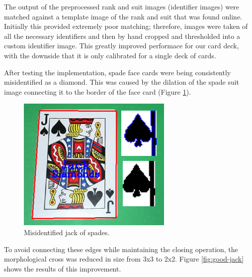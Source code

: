\documentclass[conference]{IEEEtran}
\begin{document}

The output of the preprocessed rank and suit images (identifier images) were matched against a
template image of the rank and suit that was found online. Initially this provided extremely poor
matching; therefore, images were taken of all the necessary identifiers and then by hand cropped and
thresholded into a custom identifier image. This greatly improved performace for our card deck, with
the downside that it is only calibrated for a single deck of cards.

After testing the implementation, spade face cards were being consistently misidentified as a
diamond. This was caused by the dilation of the spade suit image connecting it to the border of the
face card (Figure \ref{fig:bad-jack}).

\begin{figure}[htbp]
\centerline{\includegraphics[width=\columnwidth]{bad-jack.png}}
\caption{Misidentified jack of spades.}
\label{fig:bad-jack}
\end{figure}

To avoid connecting these edges while maintaining the closing operation, the morphological cross was
reduced in size from 3x3 to 2x2. Figure \ref{fig:good-jack} shows the results of this improvement.
\end{document}

